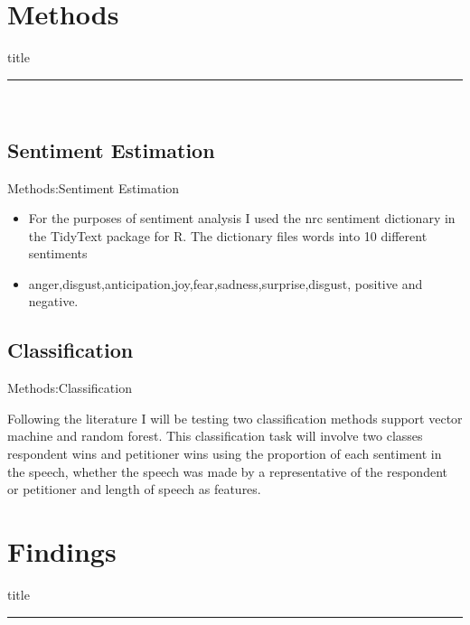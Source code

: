 \documentclass{beamer}
\begin{document}
\section{Methods}
    \begin{frame}[plain]
        \vfill
      \centering
      \begin{beamercolorbox}[sep=8pt,center,shadow=true,rounded=true]{title}
        \insertsectionhead\par%
        \color{oxfordblue}\noindent\rule{10cm}{1pt} \\
      \end{beamercolorbox}
      \vfill
  \end{frame}
  
\subsection{Sentiment Estimation}
\begin{frame}[fragile]{Methods:Sentiment Estimation}
\begin{itemize}
    \item For the purposes of sentiment analysis I used the nrc sentiment dictionary in the TidyText package for R. The dictionary files words into 10 different sentiments
    \item anger,disgust,anticipation,joy,fear,sadness,surprise,disgust,
    positive and negative.
\end{itemize}
\begin{block}{}
\end{block}
\end{frame}

\subsection{Classification}
\begin{frame}[fragile]{Methods:Classification}
\item Following the literature I will be testing two classification methods support vector machine and random forest. This classification task will involve two classes respondent wins and petitioner wins using the proportion of each sentiment in the speech, whether the speech was made by a representative of the respondent or petitioner and length of speech as features. 
\begin{block}{}
\end{block}
\end{frame}

\section{Findings}
    \begin{frame}[plain]
        \vfill
      \centering
      \begin{beamercolorbox}[sep=8pt,center,shadow=true,rounded=true]{title}
        \insertsectionhead\par%
        \color{oxfordblue}\noindent\rule{10cm}{1pt} \\
      \end{beamercolorbox}
      \vfill
  \end{frame}
  
\end{document}

